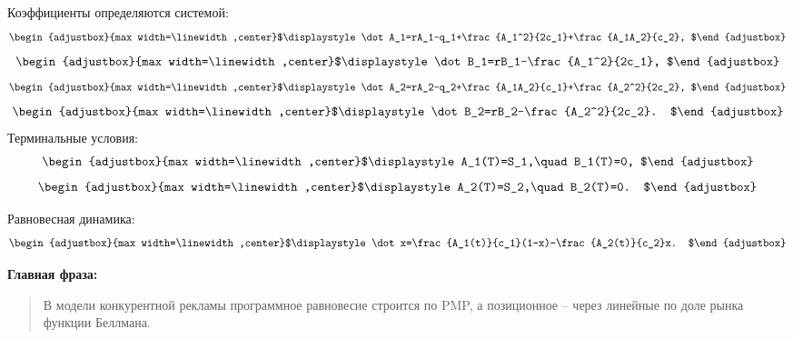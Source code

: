 \documentclass[a4paper]{article}
\newenvironment{fitdisplay}{%
  \[\begin{adjustbox}{max width=\linewidth,center}$\displaystyle
}{%
  $\end{adjustbox}\]
}
\begin{document}
\begin{multicols}{3}
Коэффициенты определяются системой:
\begin{fitdisplay}
 \dot A_1=rA_1-q_1+\frac{A_1^2}{2c_1}+\frac{A_1A_2}{c_2},
\end{fitdisplay}
\begin{fitdisplay}
 \dot B_1=rB_1-\frac{A_1^2}{2c_1},
\end{fitdisplay}
\begin{fitdisplay}
 \dot A_2=rA_2-q_2+\frac{A_1A_2}{c_1}+\frac{A_2^2}{2c_2},
\end{fitdisplay}
\begin{fitdisplay}
 \dot B_2=rB_2-\frac{A_2^2}{2c_2}.
\end{fitdisplay}
Терминальные условия:
\begin{fitdisplay}
 A_1(T)=S_1,\quad B_1(T)=0,
\end{fitdisplay}
\begin{fitdisplay}
 A_2(T)=S_2,\quad B_2(T)=0.
\end{fitdisplay}

Равновесная динамика:
\begin{fitdisplay}
 \dot x=\frac{A_1(t)}{c_1}(1-x)-\frac{A_2(t)}{c_2}x.
\end{fitdisplay}

\textbf{Главная фраза:}
\begin{quote}
В модели конкурентной рекламы программное равновесие строится по PMP, а позиционное -- через линейные по доле рынка функции Беллмана.
\end{quote}
\end{multicols}
\end{document}
